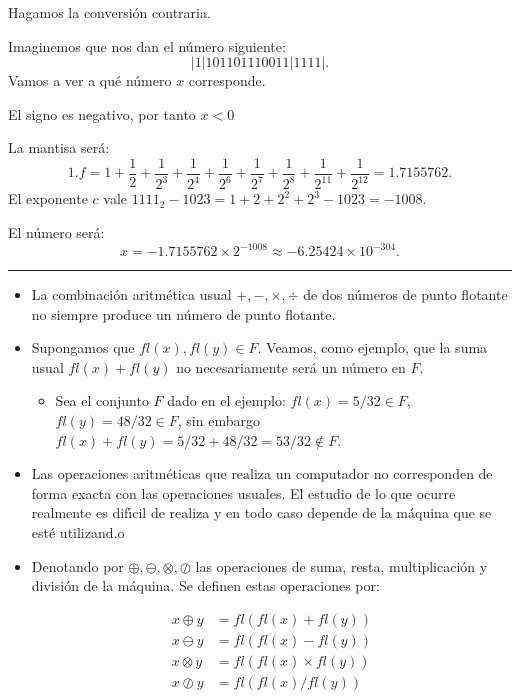 \documentclass[
]{article}
\providecommand{\tightlist}{%
  \setlength{\itemsep}{0pt}\setlength{\parskip}{0pt}}
\begin{document}
Hagamos la conversión contraria.

Imaginemos que nos dan el número siguiente: \[
|1| 101101110011| 1111|.
\] Vamos a ver a qué número \(x\) corresponde.

El signo es negativo, por tanto \(x<0\)

La mantisa será: \[
1.f=1+\frac{1}{2}+\frac{1}{2^3}+\frac{1}{2^4}+\frac{1}{2^6}+\frac{1}{2^7}+\frac{1}{2^8}+\frac{1}{2^{11}}+\frac{1}{2^{12}}=1.7155762.
\] El exponente \(c\) vale \(1111_{2}−1023=1+2+2^2+2^3−1023=−1008\).

El número será: \[
x=−1.7155762\times2^{−1008} \approx −6.25424\times10^{−304}.
\]

\begin{center}\rule{0.5\linewidth}{0.5pt}\end{center}

\begin{itemize}
\tightlist
\item
  La combinación aritmética usual \(+, −, \times, \div\) de dos números
  de punto flotante no siempre produce un número de punto flotante.
\item
  Supongamos que \(fl(x), fl(y) \in F\). Veamos, como ejemplo, que la
  suma usual \(fl(x) + fl(y)\) no necesariamente será un número en
  \(F\).

  \begin{itemize}
  \tightlist
  \item
    Sea el conjunto \(F\) dado en el ejemplo: \(fl(x) = 5/32 \in F\),
    \(fl(y) = 48/32 \in F\), sin embargo
    \(fl(x) + fl(y) = 5/32 + 48/32 = 53/32 \notin F\).
  \end{itemize}
\item
  Las operaciones aritméticas que realiza un computador no corresponden
  de forma exacta con las operaciones usuales. El estudio de lo que
  ocurre realmente es difı́cil de realiza y en todo caso depende de la
  máquina que se esté utilizand.o
\item
  Denotando por \(\oplus, \ominus, \otimes, \oslash\) las operaciones de
  suma, resta, multiplicación y división de la máquina. Se definen estas
  operaciones por:

  \[
  \begin{align*}
  x \oplus y & = fl(fl(x) + fl(y))\\
  x \ominus y & = fl(fl(x) - fl(y))\\
  x \otimes y & = fl(fl(x) \times fl(y))\\
  x \oslash y & = fl(fl(x)/fl(y))
  \end{align*}
  \]
\end{itemize}
\end{document}
